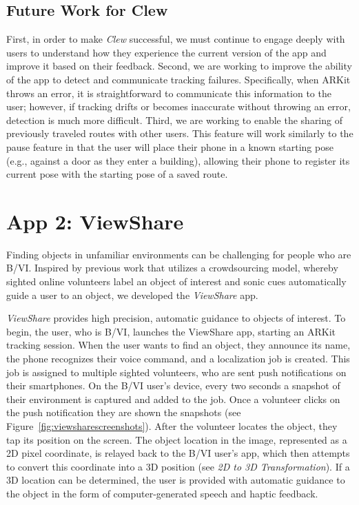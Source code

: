 \documentclass[chi_draft]{sigchi}
\newcommand{\BVI}{B/VI\xspace}
\begin{document}
\subsection{Future Work for Clew}
First, in order to make \emph{Clew} successful, we must continue to engage deeply with users to understand how they experience the current version of the app and improve it based on their feedback. Second, we are working to improve the ability of the app to detect and communicate tracking failures.  Specifically, when ARKit throws an error, it is straightforward to communicate this information to the user; however, if tracking drifts or becomes inaccurate without throwing an error, detection is much more difficult. Third, we are working to enable the sharing of previously traveled routes with other users.  This feature will work similarly to the pause feature in that the user will place their phone in a known starting pose (e.g., against a door as they enter a building), allowing their phone to register its current pose with the starting pose of a saved route.

\section{App 2: ViewShare}

Finding objects in unfamiliar environments can be challenging for people who are \BVI.  Inspired by previous work \cite{bigham2010vizwizlocateit} that utilizes a crowdsourcing model, whereby sighted online volunteers label an object of interest and sonic cues automatically guide a user to an object, we developed the \emph{ViewShare} app.

\emph{ViewShare} provides high precision, automatic guidance to objects of interest.  To begin, the user, who is \BVI, launches the ViewShare app, starting an ARKit tracking session.  When the user wants to find an object, they announce its name, the phone recognizes their voice command, and a localization job is created.  This job is assigned to multiple sighted volunteers, who are sent push notifications on their smartphones.  On the \BVI user's device, every two seconds a snapshot of their environment is captured and added to the job.  Once a volunteer clicks on the push notification they are shown the snapshots (see Figure~\ref{fig:viewsharescreenshots}).  After the volunteer locates the object, they tap its position on the screen.  The object location in the image, represented as a 2D pixel coordinate, is relayed back to the \BVI user's app, which then attempts to convert this coordinate into a 3D position (see \emph{2D to 3D Transformation}).  If a 3D location can be determined, the user is provided with automatic guidance to the object in the form of computer-generated speech and haptic feedback.
\end{document}

